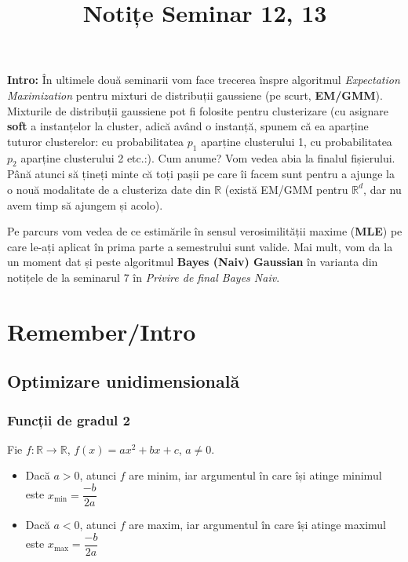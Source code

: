 \documentclass[12pt]{article}
\title{%
	\textbf{Notițe Seminar 12, 13}}
\begin{document}
	
	\maketitle
	
	\textbf{{Intro:}} În ultimele două seminarii vom face trecerea înspre algoritmul \textit{Expectation Maximization} pentru mixturi de distribuții gaussiene (pe scurt, \textbf{EM/GMM}). Mixturile de distribuții gaussiene pot fi folosite pentru clusterizare (cu asignare \textbf{soft} a instanțelor la cluster, adică având o instanță,
	spunem că ea aparține tuturor clusterelor: cu probabilitatea $p_1$ aparține clusterului 1, cu probabilitatea $p_2$ aparține clusterului 2 etc.:). Cum anume? Vom vedea abia la finalul fișierului. Până atunci să țineți minte că toți pașii pe care îi facem sunt pentru a ajunge la o nouă modalitate de a clusteriza date din $\mathbb{R}$ (există EM/GMM pentru $\mathbb{R}^d$, dar nu avem timp să ajungem și acolo).
	
	Pe parcurs vom vedea de ce estimările în sensul verosimilității maxime (\textbf{MLE}) pe care le-ați aplicat în prima parte a semestrului sunt valide. Mai mult, vom da la un moment dat și peste algoritmul \textbf{Bayes (Naiv) Gaussian} în varianta din notițele de la seminarul 7 în \textit{Privire de final Bayes Naiv}.
	
	\section{Remember/Intro}
	\subsection{Optimizare unidimensională}
	\subsubsection{Funcții de gradul 2}
	Fie $f:\mathbb{R} \rightarrow \mathbb{R}$, $f(x) = ax^2 + bx + c$, $a\neq 0$.
	\begin{itemize}
		\item Dacă $a>0$, atunci $f$ are minim, iar argumentul în care își atinge minimul este $x_\text{min} = \dfrac{-b}{2a}$
		\item Dacă $a<0$, atunci $f$ are maxim, iar argumentul în care își atinge maximul este $x_\text{max} = \dfrac{-b}{2a}$
	\end{itemize}
\end{document}
